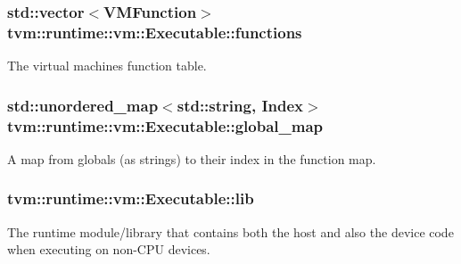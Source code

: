 \subsubsection[{\texorpdfstring{functions}{functions}}]{\setlength{\rightskip}{0pt plus 5cm}std\+::vector$<${\bf V\+M\+Function}$>$ tvm\+::runtime\+::vm\+::\+Executable\+::functions}\hypertarget{classtvm_1_1runtime_1_1vm_1_1Executable_af7d75150b6a98a7766a552d7e7e34a11}{}\label{classtvm_1_1runtime_1_1vm_1_1Executable_af7d75150b6a98a7766a552d7e7e34a11}


The virtual machine\textquotesingle{}s function table. 

\subsubsection[{\texorpdfstring{global\+\_\+map}{global_map}}]{\setlength{\rightskip}{0pt plus 5cm}std\+::unordered\+\_\+map$<$std\+::string, {\bf Index}$>$ tvm\+::runtime\+::vm\+::\+Executable\+::global\+\_\+map}\hypertarget{classtvm_1_1runtime_1_1vm_1_1Executable_a9a808f0c63ae0d65ad8d625e3a7cb749}{}\label{classtvm_1_1runtime_1_1vm_1_1Executable_a9a808f0c63ae0d65ad8d625e3a7cb749}


A map from globals (as strings) to their index in the function map. 

\subsubsection[{\texorpdfstring{lib}{lib}}]{ tvm\+::runtime\+::vm\+::\+Executable\+::lib}\hypertarget{classtvm_1_1runtime_1_1vm_1_1Executable_a0d69e974364e3f2eb643c25b77c74015}{}\label{classtvm_1_1runtime_1_1vm_1_1Executable_a0d69e974364e3f2eb643c25b77c74015}


The runtime module/library that contains both the host and also the device code when executing on non-\/\+C\+PU devices. 

